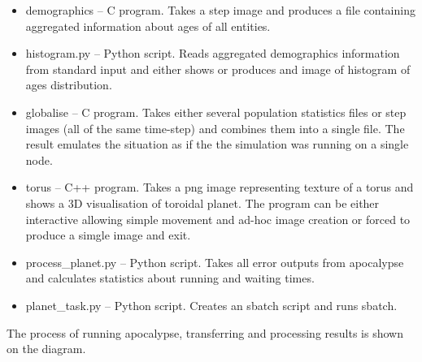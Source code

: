 \documentclass[a4paper]{article}
\begin{document}
\begin{itemize}
\item demographics -- C program. Takes a step image and produces a file containing aggregated information about ages of all entities.
\item histogram.py -- Python script. Reads aggregated demographics information from standard input and either shows or produces and image of histogram of ages distribution.
\item globalise -- C program. Takes either several population statistics files or step images (all of the same time-step) and combines them into a single file.
    The result emulates the situation as if the the simulation was running on a single node.
\item torus -- C++ program. Takes a png image representing texture of a torus and shows a 3D visualisation of toroidal planet.
    The program can be either interactive allowing simple movement and ad-hoc image creation or forced to produce a simgle image and exit.
\item process\_planet.py -- Python script. Takes all error outputs from apocalypse and calculates statistics about running and waiting times.
\item planet\_task.py -- Python script. Creates an sbatch script and runs sbatch. 
\end{itemize}

The process of running apocalypse, transferring and processing results is shown on the diagram.
\end{document}
